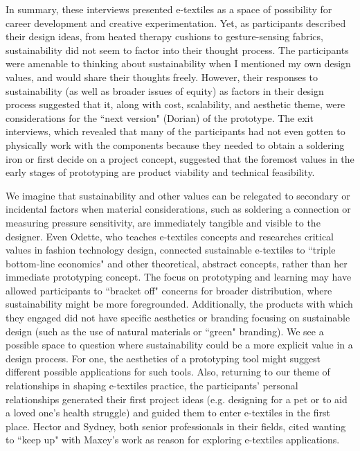 In summary, these interviews presented e-textiles as a space of possibility for career development and creative experimentation. Yet, as participants described their design ideas, from heated therapy cushions to gesture-sensing fabrics, sustainability did not seem to factor into their thought process. The participants were amenable to thinking about sustainability when I mentioned my own design values, and would share their thoughts freely. However, their responses to sustainability (as well as broader issues of equity) as factors in their design process suggested that it, along with cost, scalability, and aesthetic theme, were considerations for the ``next version" (Dorian) of the prototype. The exit interviews, which revealed that many of the participants had not even gotten to physically work with the components because they needed to obtain a soldering iron or first decide on a project concept, suggested that the foremost values in the early stages of prototyping are product viability and technical feasibility. 

We imagine that sustainability and other values can be relegated to secondary or incidental factors when material considerations, such as soldering a connection or measuring pressure sensitivity, are immediately tangible and visible to the designer. Even Odette, who teaches e-textiles concepts and researches critical values in fashion technology design, connected sustainable e-textiles to ``triple bottom-line economics" and other theoretical, abstract concepts, rather than her immediate prototyping concept. The focus on prototyping and learning may have allowed participants to ``bracket off" concerns for broader distribution, where sustainability might be more foregrounded. Additionally, the products with which they engaged did not have specific aesthetics or branding focusing on sustainable design (such as the use of natural materials or ``green" branding). We see a possible space to question where sustainability could be a more explicit value in a design process. For one, the aesthetics of a prototyping tool might suggest different possible applications for such tools. Also, returning to our theme of relationships in shaping e-textiles practice, the participants' personal relationships generated their first project ideas (e.g. designing for a pet or to aid a loved one's health struggle) and guided them to enter e-textiles in the first place. Hector and Sydney, both senior professionals in their fields, cited wanting to ``keep up" with Maxey's work as reason for exploring e-textiles applications.

